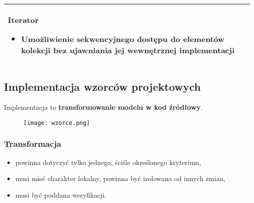 \documentclass[../main.tex]{subfiles}
\begin{document}
\begin{table}[H]
\begin{center}
\begin{tabular}{  p{8cm} c  }
                \cmidrule(r){1-1}\cmidrule(l){2-2}
                \textbf{Iterator}
                \begin{itemize}
                    \item Umożliwienie \textbf{sekwencyjnego dostępu} do elementów kolekcji bez ujawniania jej wewnętrznej implementacji
                \end{itemize}
                &
                \raisebox{-\totalheight}{\texttt{[image: iterator.png]}}
                \\

                \bottomrule
            \end{tabular}
        \end{center}
    \end{table}


    \subsection{Implementacja wzorców projektowych}
    Implementacja to \textbf{transformowanie modelu w kod źródłowy}.

    \begin{figure}[H]
        \texttt{[image: wzorce.png]}
    \end{figure}

    \subsubsection{Transformacja}
    \begin{itemize}
        \item powinna dotyczyć tylko jednego, ściśle określonego kryterium,
        \item musi mieć charakter lokalny, powinna być izolowana od innych zmian,
        \item musi być poddana weryfikacji.
    \end{itemize}
\end{document}
